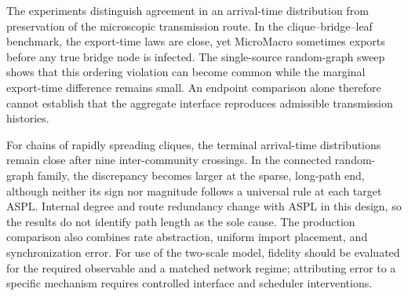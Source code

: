 \documentclass[a4paper,fleqn]{cas-sc}
\begin{document}
The experiments distinguish agreement in an arrival-time distribution from preservation of the microscopic transmission route. In the clique--bridge--leaf benchmark, the export-time laws are close, yet MicroMacro sometimes exports before any true bridge node is infected. The single-source random-graph sweep shows that this ordering violation can become common while the marginal export-time difference remains small. An endpoint comparison alone therefore cannot establish that the aggregate interface reproduces admissible transmission histories.

For chains of rapidly spreading cliques, the terminal arrival-time distributions remain close after nine inter-community crossings. In the connected random-graph family, the discrepancy becomes larger at the sparse, long-path end, although neither its sign nor magnitude follows a universal rule at each target ASPL. Internal degree and route redundancy change with ASPL in this design, so the results do not identify path length as the sole cause. The production comparison also combines rate abstraction, uniform import placement, and synchronization error. For use of the two-scale model, fidelity should be evaluated for the required observable and a matched network regime; attributing error to a specific mechanism requires controlled interface and scheduler interventions.



\end{document}
